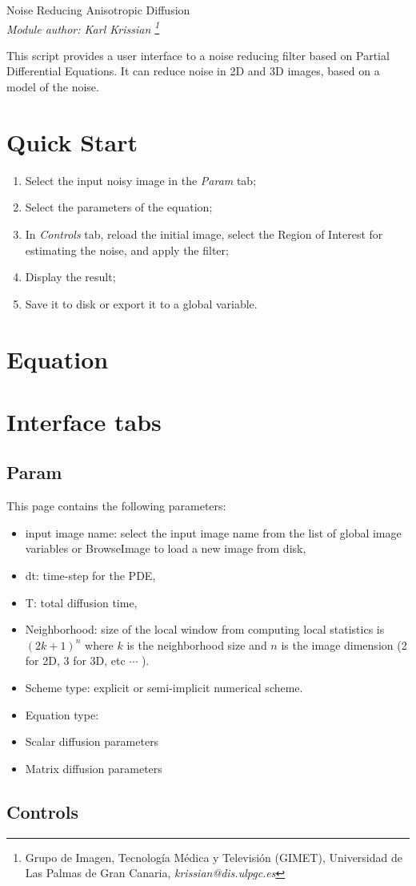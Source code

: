 \documentclass[11pt,a6paper]{article}
\begin{document}
\begin{center}
 { \Large Noise Reducing Anisotropic Diffusion }\\
 \it{ Module author:} Karl Krissian 
\footnote{
Grupo de Imagen, Tecnolog\'ia M\'edica y Televisi\'on (GIMET),
Universidad de Las Palmas de Gran Canaria, {\it krissian@dis.ulpgc.es}
}
\end{center}

This script provides a user interface to a noise reducing filter based on Partial Differential Equations. It can reduce noise in 2D and 3D images, based on a model of the noise.

\section{Quick Start}

\begin{enumerate}
 \item Select the input noisy image in the {\it Param}  tab;
 \item Select the parameters of the equation;
 \item In {\it Controls}  tab, reload the initial image, select the Region of Interest for estimating the noise, and apply the filter;
 \item Display the result;
 \item Save it to disk or export it to a global variable.
\end{enumerate}

\section{Equation}

\section{Interface tabs}

\subsection{Param} \label{sec:Param}

This page contains the following parameters:
\begin{itemize}
 \item input image name: select the input image name from the list of global image variables or BrowseImage to load a new image from disk,
 \item dt: time-step for the PDE,
 \item T: total diffusion time,
 \item Neighborhood: size of the local window from computing local statistics is ${(2k+1)}^n$ where $k$ is the neighborhood size and $n$ is the image dimension (2 for 2D, 3 for 3D, etc $\cdots$ ).
 \item Scheme type: explicit or semi-implicit numerical scheme.
 \item Equation type: 
 \item Scalar diffusion parameters
 \item Matrix diffusion parameters
\end{itemize}


\subsection{Controls} \label{sec:Controls}



\end{document}
